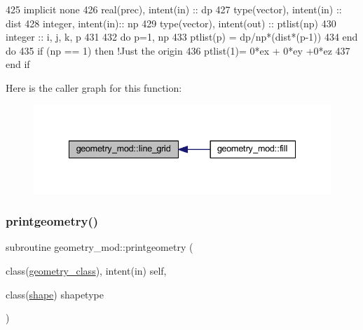 \begin{DoxyCode}
425     \textcolor{keywordtype}{implicit none}
426     \textcolor{keywordtype}{real(prec)}, \textcolor{keywordtype}{intent(in)} :: dp
427     \textcolor{keywordtype}{type}(vector), \textcolor{keywordtype}{intent(in)} :: dist
428     \textcolor{keywordtype}{integer}, \textcolor{keywordtype}{intent(in)}::  np
429     \textcolor{keywordtype}{type}(vector), \textcolor{keywordtype}{intent(out)} :: ptlist(np)
430     \textcolor{keywordtype}{integer} :: i, j, k, p
431 
432     \textcolor{keywordflow}{do} p=1, np
433         ptlist(p) = dp/np*(dist*(p-1))
434 \textcolor{keywordflow}{    end do}
435     \textcolor{keywordflow}{if} (np == 1) \textcolor{keywordflow}{then} \textcolor{comment}{!Just the origin}
436         ptlist(1)= 0*ex + 0*ey +0*ez
437 \textcolor{keywordflow}{    end if}
\end{DoxyCode}
Here is the caller graph for this function\+:
\nopagebreak
\begin{figure}[H]
\begin{center}
\leavevmode
\includegraphics[width=335pt]{namespacegeometry__mod_abcb09c0f5274c27cb79b0dd009ed94b3_icgraph}
\end{center}
\end{figure}
\mbox{\label{namespacegeometry__mod_aed4426181ca851b41717edd50268e5f3}} 
\subsubsection{\texorpdfstring{printgeometry()}{printgeometry()}}
{\footnotesize\ttfamily subroutine geometry\+\_\+mod\+::printgeometry (\begin{DoxyParamCaption}\item[{class(\mbox{\hyperlink{structgeometry__mod_1_1geometry__class}{geometry\+\_\+class}}), intent(in)}]{self,  }\item[{class(\mbox{\hyperlink{structgeometry__mod_1_1shape}{shape}})}]{shapetype }\end{DoxyParamCaption})\hspace{0.3cm}{\ttfamily [private]}}



